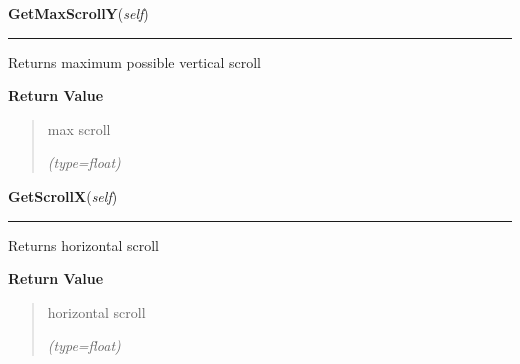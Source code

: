    \vspace{0.5ex}

\hspace{.8\funcindent}\begin{boxedminipage}{\funcwidth}

    \raggedright \textbf{GetMaxScrollY}(\textit{self})

    \vspace{-1.5ex}

    \rule{\textwidth}{0.5\fboxrule}
\setlength{\parskip}{2ex}
    Returns maximum possible vertical scroll

\setlength{\parskip}{1ex}
      \textbf{Return Value}
    \vspace{-1ex}

      \begin{quote}
      max scroll

      {\it (type=float)}

      \end{quote}

    \end{boxedminipage}

    \label{ImagePanel:ImagePanel:GetScrollX}

    \vspace{0.5ex}

\hspace{.8\funcindent}\begin{boxedminipage}{\funcwidth}

    \raggedright \textbf{GetScrollX}(\textit{self})

    \vspace{-1.5ex}

    \rule{\textwidth}{0.5\fboxrule}
\setlength{\parskip}{2ex}
    Returns horizontal scroll

\setlength{\parskip}{1ex}
      \textbf{Return Value}
    \vspace{-1ex}

      \begin{quote}
      horizontal scroll

      {\it (type=float)}

      \end{quote}

    \end{boxedminipage}

    \label{ImagePanel:ImagePanel:GetScrollY}

